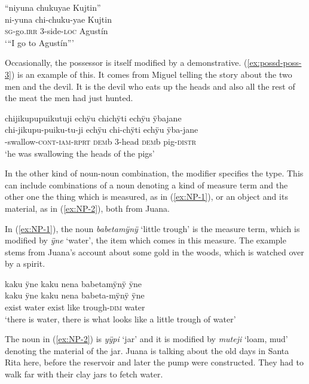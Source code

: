 \ea\label{ex:possd-poss-2}
\begingl
\glpreamble “niyuna chukuyae Kujtin”\\
\gla ni-yuna chi-chuku-yae Kujtin\\
\textsc{sg}-go.\textsc{irr} 3-side-\textsc{loc} Agustín\\
\glft ‘“I go to Agustín”’
\endgl
\trailingcitation{[jxx-p120430l-2.392]}
\xe

Occasionally, the possessor is itself modified by a demonstrative. (\ref{ex:possd-poss-3}) is an example of this. It comes from Miguel telling the story about the two men and the devil. It is the devil who eats up the heads and also all the rest of the meat the men had just hunted.

\ea\label{ex:possd-poss-3}
\begingl 
\glpreamble chijikupupuikutuji echÿu chichÿti echÿu ÿbajane\\
\gla chi-jikupu-puiku-tu-ji echÿu chi-chÿti echÿu ÿba-jane\\ 
-swallow-\textsc{cont}-\textsc{iam}-\textsc{rprt} \textsc{dem}b 3-head \textsc{dem}b pig-\textsc{distr}\\ 
\glft ‘he was swallowing the heads of the pigs’\\ 
\endgl
\trailingcitation{[mxx-n101017s-1.052-053]} 
\xe
{}

In the other kind of noun-noun combination, the modifier specifies the type. This can include combinations of a noun denoting a kind of measure term and the other one the thing which is measured, as in (\ref{ex:NP-1}), or an object and its material, as in (\ref{ex:NP-2}), both from Juana.

In (\ref{ex:NP-1}), the  noun \textit{babetamÿnÿ} ‘little trough’ is the measure term, which is modified by \textit{ÿne} ‘water’, the item which comes in this measure. The example stems from Juana’s account about some gold in the woods, which is watched over by a spirit.

\ea\label{ex:NP-1}
\begingl
\glpreamble kaku ÿne kaku nena babetamÿnÿ ÿne\\
\gla kaku ÿne kaku nena babeta-mÿnÿ ÿne\\
\glb exist water exist like trough-\textsc{dim} water\\
\glft ‘there is water, there is what looks like a little trough of water’
\endgl
\trailingcitation{[jxx-p151020l-2]}
\xe

The  noun in (\ref{ex:NP-2}) is \textit{yÿpi} ‘jar’ and it is modified by \textit{muteji} ‘loam, mud’ denoting the material of the jar. Juana is talking about the old days in Santa Rita here, before the reservoir and later the pump were constructed. They had to walk far with their clay jars to fetch water.


